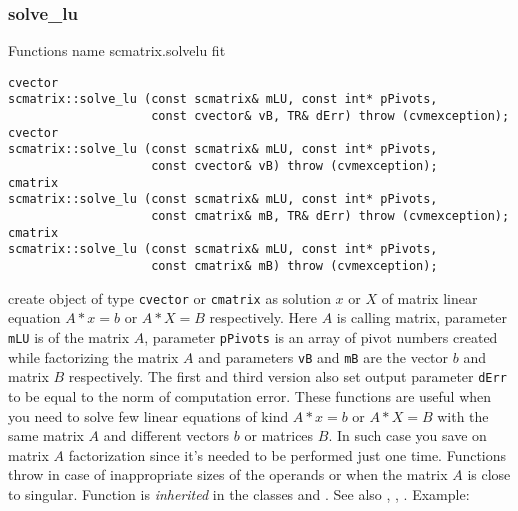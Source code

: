 \subsubsection{solve\_lu}
Functions%
\pdfdest name {scmatrix.solvelu} fit
\begin{verbatim}
cvector
scmatrix::solve_lu (const scmatrix& mLU, const int* pPivots,
                    const cvector& vB, TR& dErr) throw (cvmexception);
cvector
scmatrix::solve_lu (const scmatrix& mLU, const int* pPivots,
                    const cvector& vB) throw (cvmexception);
cmatrix
scmatrix::solve_lu (const scmatrix& mLU, const int* pPivots,
                    const cmatrix& mB, TR& dErr) throw (cvmexception);
cmatrix
scmatrix::solve_lu (const scmatrix& mLU, const int* pPivots,
                    const cmatrix& mB) throw (cvmexception);
\end{verbatim}
create  object of type \verb"cvector" or \verb"cmatrix" as
 solution $x$ or $X$ of matrix linear equation
$A*x=b$ or $A*X=B$ respectively. Here $A$ is  calling
matrix, 
parameter \verb"mLU" is 
of the matrix $A$, parameter \verb"pPivots" is an array of pivot numbers
created while factorizing the matrix $A$
and parameters \verb"vB" and \verb"mB" are the vector $b$ and
matrix $B$ respectively.
The first and third version also set output parameter \verb"dErr" to be equal
to the norm of computation error.
These functions are useful when you need to solve few linear equations
of kind $A*x=b$ or $A*X=B$ with the same matrix $A$ and different vectors $b$ 
or matrices $B$.
In such case you save on matrix $A$ factorization since it's needed to be
performed just one time.
Functions throw 
in case of inappropriate sizes
of the operands or when the matrix $A$ is close to singular.
Function is \emph{inherited} in the classes
and .
See also
,
,
.
Example:
